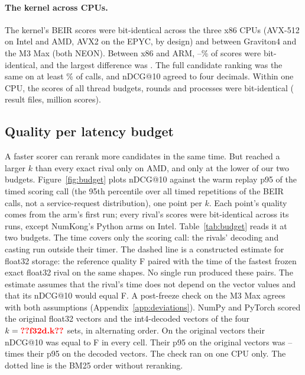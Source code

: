 \paragraph{The kernel across CPUs.}
The kernel's BEIR scores were bit-identical across the three x86 CPUs (AVX-512 on Intel and AMD, AVX2 on the EPYC, by design) and between Graviton4 and the M3 Max (both NEON).
Between x86 and ARM, --\% of scores were bit-identical, and the largest difference was .
The full candidate ranking was the same on at least \% of calls, and nDCG@10 agreed to four decimals.
Within one CPU, the scores of all thread budgets, rounds and processes were bit-identical ( result files,  million scores).

\subsection{Quality per latency budget}
\label{sec:budget}

A faster scorer can rerank more candidates in the same time.
But \sweet reached a larger $k$ than every exact rival only on AMD, and only at the lower of our two budgets.
Figure~\ref{fig:budget} plots nDCG@10 against the warm replay p95 of the timed scoring call (the 95th percentile over all timed repetitions of the BEIR calls, not a service-request distribution), one point per $k$. Each point's quality comes from the arm's first run; every rival's scores were bit-identical across its runs, except NumKong's Python arms on Intel.
Table~\ref{tab:budget} reads it at two budgets.
The time covers only the scoring call: the rivals' decoding and casting run outside their timer.
The dashed line is a constructed estimate for float32 storage: the reference quality F paired with the time of the fastest frozen exact float32 rival on the same shapes. No single run produced these pairs.
The estimate assumes that the rival's time does not depend on the vector values and that its nDCG@10 would equal F.
A post-freeze check on the M3 Max agrees with both assumptions (Appendix~\ref{app:deviations}).
NumPy and PyTorch scored the original float32 vectors and the int4-decoded vectors of the four $k = \nm{f32d.k}$ sets, in alternating order.
On the original vectors their nDCG@10 was equal to F in every cell.
Their p95 on the original vectors was -- times their p95 on the decoded vectors.
The check ran on one CPU only.
The dotted line is the BM25 order without reranking.

